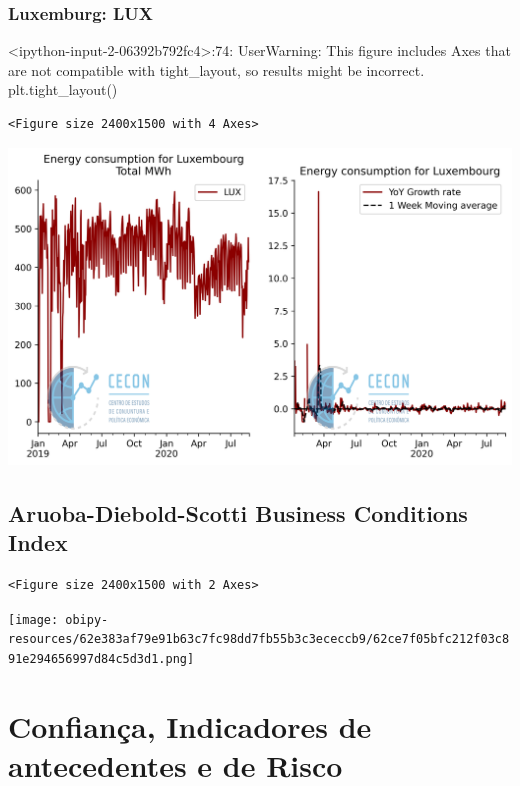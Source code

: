 \documentclass[11pt]{article}
\begin{document}
\subsubsection{Luxemburg: LUX}
\label{sec:orge4f75ef}

<ipython-input-2-06392b792fc4>:74: UserWarning: This figure includes Axes that are not compatible with tight\_layout, so results might be incorrect.
  plt.tight\_layout()

\begin{verbatim}
<Figure size 2400x1500 with 4 Axes>
\end{verbatim}


\begin{center}
\includegraphics[width=.9\linewidth]{obipy-resources/62e383af79e91b63c7fc98dd7fb55b3c3ececcb9/9106e308f42f1f76c029539778f3952a7f562f15.png}
\end{center}


\subsection{Aruoba-Diebold-Scotti Business Conditions Index}
\label{sec:org5d58537}

\begin{verbatim}
<Figure size 2400x1500 with 2 Axes>
\end{verbatim}


\begin{center}
\texttt{[image: obipy-resources/62e383af79e91b63c7fc98dd7fb55b3c3ececcb9/62ce7f05bfc212f03c891e294656997d84c5d3d1.png]}
\end{center}

\section{Confiança, Indicadores de antecedentes e de Risco}
\label{sec:orgd23c0ff}
\end{document}
